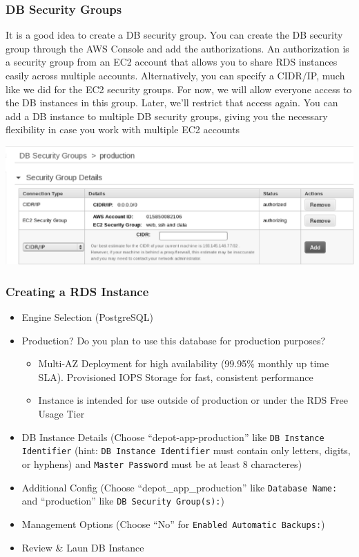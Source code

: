 \documentclass{beamer}
\begin{document}
\begin{frame}
\frametitle{DB Security Groups}
It is a good idea to create a DB security group. You can create the DB security group through the AWS Console and add the authorizations.
An authorization is a security group from an EC2 account that allows you to
share RDS instances easily across multiple accounts. Alternatively, you can specify a
CIDR/IP, much like we did for the EC2 security groups. For now, we will allow everyone
access to the DB instances in this group. Later, we’ll restrict that access again. You can
add a DB instance to multiple DB security groups, giving you the necessary flexibility
in case you work with multiple EC2 accounts

\begin{center}
      \includegraphics[scale=0.25]{securitydb.eps}
\end{center}
\end{frame}
\begin{frame}
\frametitle{Creating a RDS Instance}
\begin{itemize}
 \item Engine Selection (PostgreSQL)
 \item Production? Do you plan to use this database for production purposes?
    \begin{itemize}
      \item Multi-AZ Deployment for high availability (99.95\% monthly up time SLA). Provisioned IOPS Storage for fast, consistent performance
      \item Instance is intended for use outside of production or under the \alert{RDS Free Usage Tier}
    \end{itemize}
 \item DB Instance Details (Choose ``depot-app-production'' like \texttt{DB Instance Identifier} (hint: \texttt{DB Instance Identifier} must contain only letters, digits, or hyphens) and \texttt{Master Password} must be at least 8 characteres)
  \item Additional Config (Choose ``depot\_app\_production'' like \texttt{Database Name:} and ``production'' like \texttt{DB Security Group(s):})
  \item Management Options (Choose ``No'' for \texttt{Enabled Automatic Backups:}) 
  \item Review \& Laun DB Instance
  \end{itemize}
\end{frame}
\end{document}
